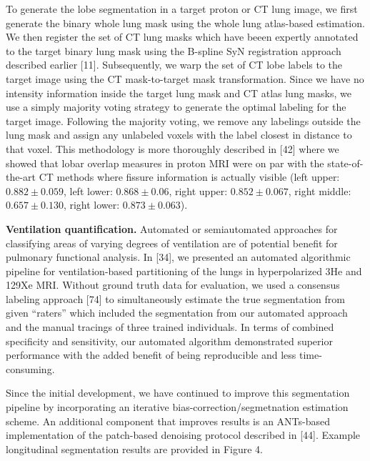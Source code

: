 \documentclass[11pt,]{article}
\begin{document}
To generate the lobe segmentation in a target proton or CT lung image,
we first generate the binary whole lung mask using the whole lung
atlas-based estimation. We then register the set of CT lung masks which
have beeen expertly annotated to the target binary lung mask using the
B-spline SyN registration approach described earlier {[}11{]}.
Subsequently, we warp the set of CT lobe labels to the target image
using the CT mask-to-target mask transformation. Since we have no
intensity information inside the target lung mask and CT atlas lung
masks, we use a simply majority voting strategy to generate the optimal
labeling for the target image. Following the majority voting, we remove
any labelings outside the lung mask and assign any unlabeled voxels with
the label closest in distance to that voxel. This methodology is more
thoroughly described in {[}42{]} where we showed that lobar overlap
measures in proton MRI were on par with the state-of-the-art CT methods
where fissure information is actually visible (left upper:
$0.882 \pm 0.059$, left lower: $0.868 \pm 0.06$, right upper:
$0.852 \pm 0.067$, right middle: $0.657 \pm 0.130$, right lower:
$0.873 \pm 0.063$).

\textbf{Ventilation quantification.} Automated or semiautomated
approaches for classifying areas of varying degrees of ventilation are
of potential benefit for pulmonary functional analysis. In {[}34{]}, we
presented an automated algorithmic pipeline for ventilation-based
partitioning of the lungs in hyperpolarized 3He and 129Xe MRI. Without
ground truth data for evaluation, we used a consensus labeling approach
{[}74{]} to simultaneously estimate the true segmentation from given
``raters'' which included the segmentation from our automated approach
and the manual tracings of three trained individuals. In terms of
combined specificity and sensitivity, our automated algorithm
demonstrated superior performance with the added benefit of being
reproducible and less time-consuming.

Since the initial development, we have continued to improve this
segmentation pipeline by incorporating an iterative
bias-correction/segmetnation estimation scheme. An additional component
that improves results is an ANTs-based implementation of the patch-based
denoising protocol described in {[}44{]}. Example longitudinal
segmentation results are provided in Figure 4.
\end{document}
